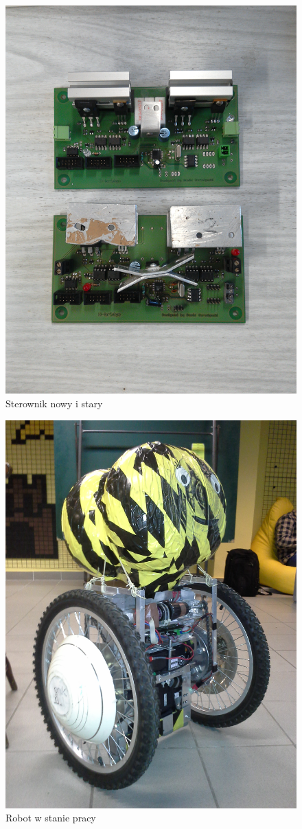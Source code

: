 \documentclass{article}
\begin{document}
\begin{figure}[h!]
\centering
\includegraphics[scale=0.15 , angle=270, origin=c]{Drivers.jpg}
\caption{Sterownik nowy i stary}
\end{figure}

\begin{figure}[h!]
\centering
\includegraphics[scale=0.18 , angle=270, origin=c]{Robot.jpg}
\caption{Robot w stanie pracy}
\end{figure}
\end{document}
